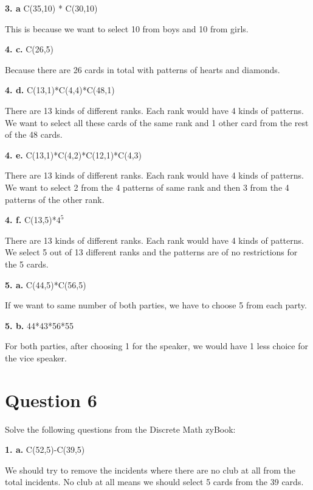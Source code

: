 \documentclass[11pt]{article}
\begin{document}
	\vspace{10mm}
	\textbf{3. a}
	C(35,10) * C(30,10)
	
	This is because we want to select 10 from boys and 10 from girls.
	
	\vspace{10mm}
	\textbf{4. c.}
	C(26,5)
	
	Because there are 26 cards in total with patterns of hearts and diamonds.
	
	\vspace{10mm}
	\textbf{4. d.}
	C(13,1)*C(4,4)*C(48,1)
	
	There are 13 kinds of different ranks. Each rank would have 4 kinds of patterns. We want to select all these cards of the same rank and 1 other card from the rest of the 48 cards.
	
	\vspace{10mm}
	\textbf{4. e.}
	C(13,1)*C(4,2)*C(12,1)*C(4,3)
	
	There are 13 kinds of different ranks. Each rank would have 4 kinds of patterns. We want to select 2 from the 4 patterns of same rank and then 3 from the 4 patterns of the other rank.
	
	\vspace{10mm}
	\textbf{4. f.}
	C(13,5)*$4^5$
	
	There are 13 kinds of different ranks. Each rank would have 4 kinds of patterns. We select 5 out of 13 different ranks and the patterns are of no restrictions for the 5 cards.
	
	\vspace{10mm}
	\textbf{5. a.}
	C(44,5)*C(56,5)
	
	If we want to same number of both parties, we have to choose 5 from each party.
	
	\vspace{10mm}
	\textbf{5. b.}
	44*43*56*55
	
	For both parties, after choosing 1 for the speaker, we would have 1 less choice for the vice speaker.

	
	\newpage
	\section*{Question 6}
	Solve the following questions from the Discrete Math zyBook:
	
	\textbf{1. a.}
	C(52,5)-C(39,5)
	
	We should try to remove the incidents where there are no club at all from the total incidents. No club at all means we should select 5 cards from the 39 cards.
	
\end{document}
